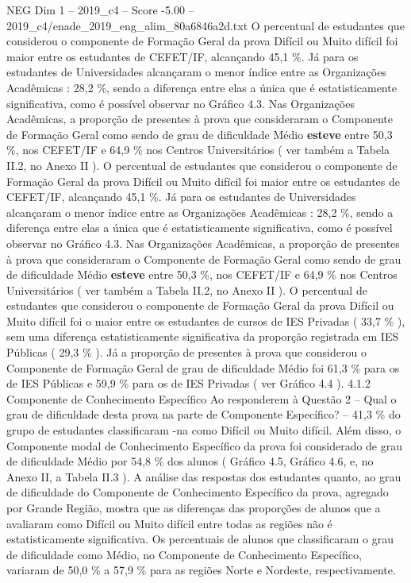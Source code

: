 \begin{textsample}{NEG Dim 1 – 2019\_c4 – Score -5.00 – 2019\_c4/enade\_2019\_eng\_alim\_80a6846a2d.txt}
O percentual de estudantes que considerou o componente de Formação Geral da prova Difícil ou Muito difícil foi maior entre os estudantes de CEFET/IF, alcançando 45,1 \%.
Já para os estudantes de Universidades alcançaram o menor índice entre as Organizações Acadêmicas : 28,2 \%, sendo a diferença entre elas a única que é estatisticamente significativa, como é possível observar no Gráfico 4.3.
Nas Organizações Acadêmicas, a proporção de presentes à prova que consideraram o Componente de Formação Geral como sendo de grau de dificuldade Médio \textbf{esteve} entre 50,3 \%, nos CEFET/IF e 64,9 \% nos Centros Universitários ( ver também a Tabela II.2, no Anexo II ).
O percentual de estudantes que considerou o componente de Formação Geral da prova Difícil ou Muito difícil foi maior entre os estudantes de CEFET/IF, alcançando 45,1 \%.
Já para os estudantes de Universidades alcançaram o menor índice entre as Organizações Acadêmicas : 28,2 \%, sendo a diferença entre elas a única que é estatisticamente significativa, como é possível observar no Gráfico 4.3.
Nas Organizações Acadêmicas, a proporção de presentes à prova que consideraram o Componente de Formação Geral como sendo de grau de dificuldade Médio \textbf{esteve} entre 50,3 \%, nos CEFET/IF e 64,9 \% nos Centros Universitários ( ver também a Tabela II.2, no Anexo II ).
O percentual de estudantes que considerou o componente de Formação Geral da prova Difícil ou Muito difícil foi o maior entre os estudantes de cursos de IES Privadas ( 33,7 \% ), sem uma diferença estatisticamente significativa da proporção registrada em IES Públicas ( 29,3 \% ).
Já a proporção de presentes à prova que considerou o Componente de Formação Geral de grau de dificuldade Médio foi 61,3 \% para os de IES Públicas e 59,9 \% para os de IES Privadas ( ver Gráfico 4.4 ). 4.1.2 Componente de Conhecimento Específico Ao responderem à Questão 2 – Qual o grau de dificuldade desta prova na parte de Componente Específico? – 41,3 \% do grupo de estudantes classificaram -na como Difícil ou Muito difícil.
Além disso, o Componente modal de Conhecimento Específico da prova foi considerado de grau de dificuldade Médio por 54,8 \% dos alunos ( Gráfico 4.5, Gráfico 4.6, e, no Anexo II, a Tabela II.3 ).
A análise das respostas dos estudantes quanto, ao grau de dificuldade do Componente de Conhecimento Específico da prova, agregado por Grande Região, mostra que as diferenças das proporções de alunos que a avaliaram como Difícil ou Muito difícil entre todas as regiões não é estatisticamente significativa.
Os percentuais de alunos que classificaram o grau de dificuldade como Médio, no Componente de Conhecimento Específico, variaram de 50,0 \% a 57,9 \% para as regiões Norte e Nordeste, respectivamente.

\end{textsample}
